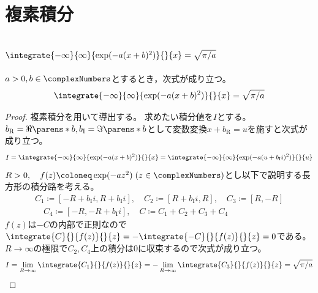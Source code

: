 \chapter{複素積分}
    \section{\texorpdfstring{$\integrate{-\infty}{\infty}{\exp(-a(x+b)^2)}{}{x} = \sqrt{\pi/a}$}{Gauss積分で積分変数にオフセットがある場合}}
        \begin{shadebox}
            $a>0,b\in\complexNumbers$とするとき，次式が成り立つ。
            \[ \integrate{-\infty}{\infty}{\exp(-a(x+b)^2)}{}{x} = \sqrt{\pi/a} \]
        \end{shadebox}
        \begin{proof}
            複素積分を用いて導出する。
            求めたい積分値を$I$とする。
            $b_\mathrm{R} = \Re\parens*{b},b_\mathrm{I} = \Im\parens*{b}$として変数変換$x+b_\mathrm{R} = u$を施すと次式が成り立つ。
            \[ I = \integrate{-\infty}{\infty}{\exp(-a(x+b)^2)}{}{x} = \integrate{-\infty}{\infty}{\exp(-a(u+b_\mathrm{I}i)^2)}{}{u} \]
            $R>0,\quad f(z) \coloneq \exp(-az^2)\;(z\in\complexNumbers)$とし以下で説明する長方形の積分路を考える。
            \begin{gather*}
                C_1 \coloneq [-R+b_\mathrm{I}i,R+b_\mathrm{I}i],\quad C_2 \coloneq [R+b_\mathrm{I}i,R],\quad C_3 \coloneq [R,-R] \\
                \quad C_4 \coloneq [-R,-R+b_\mathrm{I}i],\quad C \coloneq C_1+C_2+C_3+C_4
            \end{gather*}
            $f(z)$は$-C$の内部で正則なので$\integrate{C}{}{f(z)}{}{z} = -\integrate{-C}{}{f(z)}{}{z} = 0$である。
            $R\to\infty$の極限で$C_2,C_4$上の積分は0に収束するので次式が成り立つ。
            \[ I = \lim_{R\to\infty}\integrate{C_1}{}{f(z)}{}{z} = -\lim_{R\to\infty}\integrate{C_3}{}{f(z)}{}{z} = \sqrt{\pi/a} \]
        \end{proof}
